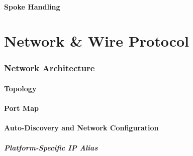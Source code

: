 \documentclass[11pt,letterpaper]{article}
\begin{document}
\subsection{Spoke Handling}
\label{subsec:pulse-spoke-handling}



%
%

\newpage
\part{Network \& Wire Protocol}
\label{part:protocol}


\section{Network Architecture}
\label{sec:network-architecture}

\subsection{Topology}
\label{subsec:network-topology}


\subsection{Port Map}
\label{subsec:port-map}


\subsection{Auto-Discovery and Network Configuration}
\label{subsec:auto-discovery}


\subsubsection{Platform-Specific IP Alias}
\label{subsubsec:ip-alias}

\end{document}
